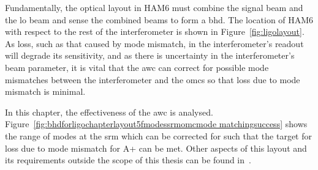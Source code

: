 Fundamentally, the optical layout in HAM6 must combine the signal beam and the \gls{lo} beam and sense the combined beams to form a \gls{bhd}. The location of HAM6 with respect to the rest of the interferometer is shown in Figure~\ref{fig:ligolayout}. As loss, such as that caused by mode mismatch, in the interferometer's readout will degrade its sensitivity, and as there is uncertainty in the interferometer's beam parameter, it is vital that the \gls{awc} can correct for possible mode mismatches between the interferometer and the \glspl{omc} so that loss due to mode mismatch is minimal.
\par
In this chapter, the effectiveness of the \gls{awc} is analysed. Figure~\ref{fig:bhdforligochapterlayout5fmodessrmomcmode matchingsuccess} shows the range of modes at the \gls{srm} which can be corrected for such that the target for loss due to mode mismatch for A+ can be met. Other aspects of this layout and its requirements outside the scope of this thesis can be found in~\cite{CDR_BHD,BHD_ISC_requirements}.
